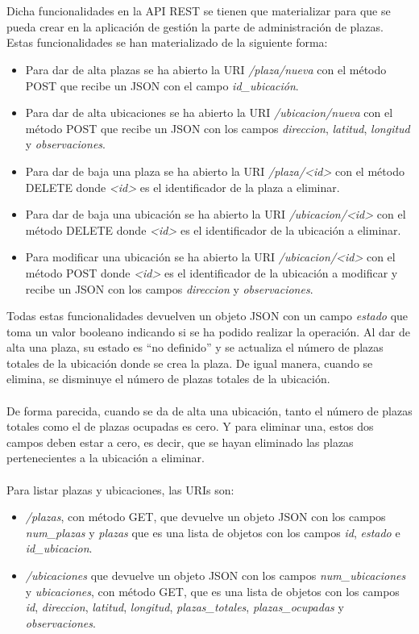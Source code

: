 \\\\
Dicha funcionalidades en la API REST se tienen que materializar para que se pueda crear en la aplicación de gestión la parte de administración de plazas. Estas funcionalidades se han materializado de la siguiente forma:
\begin{itemize}
	\item Para dar de alta plazas se ha abierto la URI \textit{/plaza/nueva} con el método POST que recibe un JSON con el campo \textit{id\_ubicación}.
	\item Para dar de alta ubicaciones se ha abierto la URI \textit{/ubicacion/nueva} con el método POST que recibe un JSON con los campos \textit{direccion}, \textit{latitud}, \textit{longitud} y \textit{observaciones}.
	\item Para dar de baja una plaza se ha abierto la URI \textit{/plaza/<id>} con el método DELETE donde \textit{<id>} es el identificador de la plaza a eliminar.
	\item Para dar de baja una ubicación se ha abierto la URI \textit{/ubicacion/<id>} con el método DELETE donde \textit{<id>} es el identificador de la ubicación a eliminar.
	\item Para modificar una ubicación se ha abierto la URI \textit{/ubicacion/<id>} con el método POST donde \textit{<id>} es el identificador de la ubicación a modificar y recibe un JSON con los campos \textit{direccion} y \textit{observaciones}.
\end{itemize}
Todas estas funcionalidades devuelven un objeto JSON con un campo \textit{estado} que toma un valor booleano indicando si se ha podido realizar la operación. Al dar de alta una plaza, su estado es ``no definido'' y se actualiza el número de plazas totales de la ubicación donde se crea la plaza. De igual manera, cuando se elimina, se disminuye el número de plazas totales de la ubicación.
\\\\
De forma parecida, cuando se da de alta una ubicación, tanto el número de plazas totales como el de plazas ocupadas es cero. Y para eliminar una, estos dos campos deben estar a cero, es decir, que se hayan eliminado las plazas pertenecientes a la ubicación a eliminar.
\\\\
Para listar plazas y ubicaciones, las URIs son:
\begin{itemize}
	\item \textit{/plazas}, con método GET, que devuelve un objeto JSON con los campos \textit{num\_plazas} y \textit{plazas} que es una lista de objetos con los campos \textit{id}, \textit{estado} e \textit{id\_ubicacion}. 
	\item \textit{/ubicaciones} que devuelve un objeto JSON con los campos \textit{num\_ubicaciones} y \textit{ubicaciones}, con método GET, que es una lista de objetos con los campos \textit{id}, \textit{direccion}, \textit{latitud}, \textit{longitud}, \textit{plazas\_totales}, \textit{plazas\_ocupadas} y \textit{observaciones}. 
\end{itemize}
